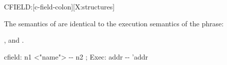 \begin{worddef}{}{CFIELD:}[c-field-colon][X:structures]
\item \stack{}{}

	The semantics of  are identical to the
	execution semantics of the phrase:
	\begin{quote}  
	\end{quote}

\see {},
	 and
	.

	\begin{defer}
	\implementation

		\word{:} cfield:\tab{} n1 <"name"> -{}- n2 ; Exec: addr -{}- 'addr \\
		   \\
		\word{;}
	\end{defer}
\end{worddef}


